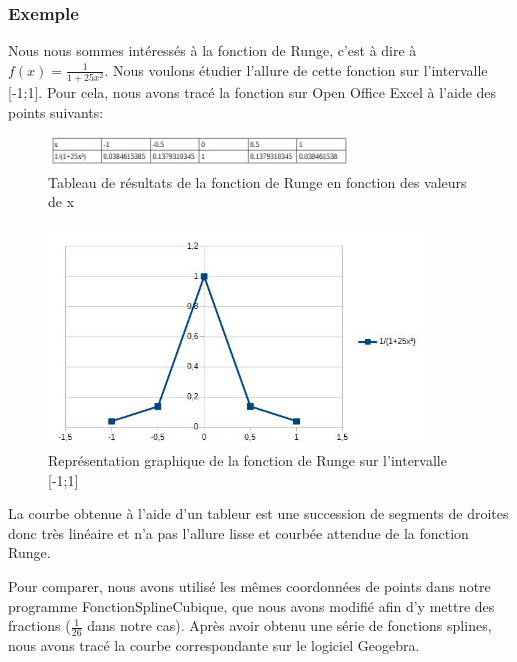 \documentclass{article}
\begin{document}
\begin{huge}
	\subsubsection{Exemple} 
\end{huge}
Nous nous sommes int\'{e}ress\'{e}s \`a la fonction de Runge, c'est \`a dire \`a $f(x)=\frac{1}{1+25x^{2}}$. Nous voulons \'{e}tudier l'allure de cette fonction sur l'intervalle [-1;1]. Pour cela, nous avons trac\'{e} la fonction sur Open Office Excel \`a l'aide des points suivants:

\begin{figure}[h]
	\centering
	\includegraphics[width=8cm]{TableauDeValeurs.png}
	\caption{Tableau de r\'{e}sultats de la fonction de Runge en fonction des valeurs de x}
\end{figure}

\vspace{2\baselineskip}

\begin{figure}[h]
	\centering
	\includegraphics[width=10cm]{CourbeFonctionRunge.png}
	\caption{Repr\'{e}sentation graphique de la fonction de Runge sur l'intervalle [-1;1] }
\end{figure}

\newpage
La courbe obtenue \`a l'aide d'un tableur est une succession de segments de droites donc tr\`{e}s lin\'{e}aire et n'a pas l'allure lisse et courb\'{e}e attendue de la fonction Runge. 

Pour comparer, nous avons utilis\'{e} les m\^{e}mes coordonn\'{e}es de points dans notre programme FonctionSplineCubique, que  nous avons modifi\'{e} afin d'y mettre des fractions ($\frac{1}{26}$ dans notre cas). Apr\`es avoir obtenu une s\'{e}rie de fonctions splines, nous avons trac\'{e} la courbe correspondante sur le logiciel Geogebra. 
\end{document}
